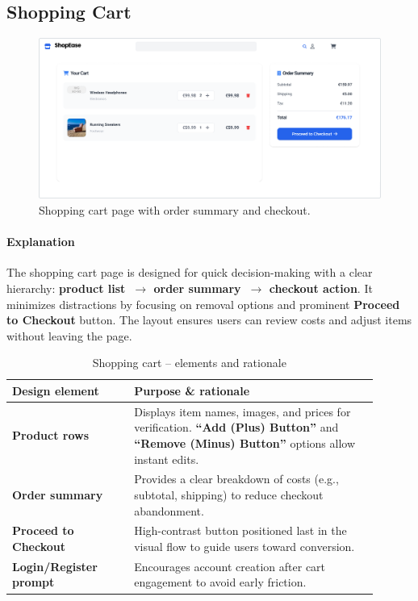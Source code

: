 \documentclass[12pt]{article}
\begin{document}
	\subsection{Shopping Cart}\label{subsec:shopping-cart}

	\begin{figure}[H]
		\centering
		\includegraphics[width=\linewidth]{pictures/main/ShoppingCart_Figma}%
		\caption{Shopping cart page with order summary and checkout.}
		\label{fig:ui-cart}
	\end{figure}

	\paragraph{Explanation}%
	The shopping cart page is designed for quick decision-making with a clear hierarchy:
	\textbf{product list~$\rightarrow$ order summary~$\rightarrow$ checkout action}. It minimizes distractions
	by focusing on removal options and prominent \textbf{Proceed to Checkout} button.
	The layout ensures users can review costs and adjust items without leaving the page.

	\begin{table}[H]
		\centering
		\caption{Shopping cart – elements and rationale}
		\label{tab:cart-elements}

		\begin{tabular}{p{0.30\linewidth} p{0.60\linewidth}}
        	\toprule
        	\textbf{Design element} & \textbf{Purpose \& rationale} \\ \midrule
				\textbf{Product rows}            & Displays item names, images, and prices for verification.
												 \textbf{``Add (Plus) Button''} and \textbf{``Remove (Minus) Button''} options allow instant edits. \\
				\textbf{Order summary}           & Provides a clear breakdown of costs (e.g., subtotal, shipping) to reduce checkout abandonment. \\
				\textbf{Proceed to Checkout}     & High-contrast button positioned last in the visual flow to guide users toward conversion. \\
				\textbf{Login/Register prompt}   & Encourages account creation after cart engagement to avoid early friction. \\
        	\bottomrule
    	\end{tabular}

	\end{table}
\end{document}

